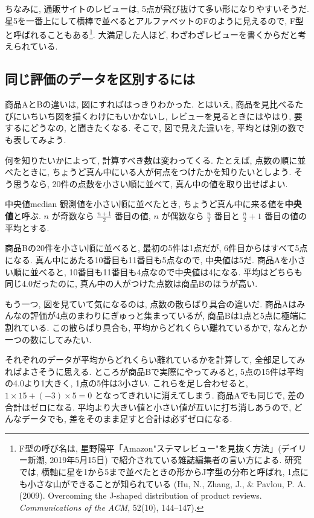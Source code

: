     ちなみに, 通販サイトのレビューは, 5点が飛び抜けて多い形になりやすいそうだ.
    星5を一番上にして横棒で並べるとアルファベットのFのように見えるので, F型と呼ばれることもある\footnote{%
    F型の呼び名は, 星野陽平「Amazon"ステマレビュー"を見抜く方法」(デイリー新潮, 2019年5月15日) で紹介されている雑誌編集者の言い方による.
    研究では, 横軸に星を1から5まで並べたときの形からJ字型の分布と呼ばれ, 1点にも小さな山ができることが知られている (Hu, N., Zhang, J., \& Pavlou, P. A. (2009). Overcoming the J-shaped distribution of product reviews. \textit{Communications of the ACM}, 52(10), 144--147).}.
    大満足した人ほど, わざわざレビューを書くからだと考えられている.

  \subsection{同じ評価のデータを区別するには}

    商品AとBの違いは, 図にすればはっきりわかった.
    とはいえ, 商品を見比べるたびにいちいち図を描くわけにもいかないし, レビューを見るときにはやはり, 要するにどうなの, と聞きたくなる.
    そこで, 図で見えた違いを, 平均とは別の数でも表してみよう.

    何を知りたいかによって, 計算すべき数は変わってくる.
    たとえば, 点数の順に並べたときに, ちょうど真ん中にいる人が何点をつけたかを知りたいとしよう.
    そう思うなら, 20件の点数を小さい順に並べて, 真ん中の値を取り出せばよい.

    \begin{defi}{中央値}{median}
      観測値を小さい順に並べたとき, ちょうど真ん中に来る値を\textbf{中央値}と呼ぶ.
      $n$ が奇数なら $\frac{n+1}{2}$ 番目の値,
      $n$ が偶数なら $\frac{n}{2}$ 番目と $\frac{n}{2}+1$ 番目の値の平均とする.
    \end{defi}

    商品Bの20件を小さい順に並べると, 最初の5件は1点だが, 6件目からはすべて5点になる.
    真ん中にあたる10番目も11番目も5点なので, 中央値は5だ.
    商品Aを小さい順に並べると, 10番目も11番目も4点なので中央値は4になる.
    平均はどちらも同じ4.0だったのに, 真ん中の人がつけた点数は商品Bのほうが高い.

    もう一つ, 図を見ていて気になるのは, 点数の散らばり具合の違いだ.
    商品Aはみんなの評価が4点のまわりにぎゅっと集まっているが, 商品Bは1点と5点に極端に割れている.
    この散らばり具合も, 平均からどれくらい離れているかで, なんとか一つの数にしてみたい.

    それぞれのデータが平均からどれくらい離れているかを計算して, 全部足してみればよさそうに思える.
    ところが商品Bで実際にやってみると, 5点の15件は平均の4.0より1大きく, 1点の5件は3小さい.
    これらを足し合わせると, $1 \times 15 + (-3) \times 5 = 0$ となってきれいに消えてしまう.
    商品Aでも同じで, 差の合計はゼロになる.
    平均より大きい値と小さい値が互いに打ち消しあうので, どんなデータでも, 差をそのまま足すと合計は必ずゼロになる.

